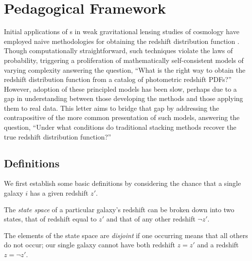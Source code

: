 \section{Pedagogical Framework}


Initial applications of \pzpdf s in weak gravitational lensing studies of cosmology have employed naive methodologies for obtaining the redshift distribution function \Nz.
Though computationally straightforward, such techniques violate the laws of probability, triggering a proliferation of mathematically self-consistent models of varying complexity answering the question, ``What is the right way to obtain the redshift distribution function from a catalog of photometric redshift PDFs?''
However, adoption of these principled models has been slow, perhaps due to a gap in understanding between those developing the methods and those applying them to real data.
This letter aims to bridge that gap by addressing the contrapositive of the more common presentation of such models, answering the question, ``Under what conditions do traditional stacking methods recover the true redshift distribution function?''

\subsection{Definitions}

We first establish some basic definitions by considering the chance that a single galaxy $i$ has a given redshift $z'$.

\begin{definition}\label{def:binarystatespace}
	The \textit{state space} of a particular galaxy's redshift can be broken down into two states, that of redshift equal to $z'$ and that of any other redshift $\lnot z'$.
\end{definition}

\begin{definition}\label{def:disjoint}
	The elements of the state space are \textit{disjoint} if one occurring means that all others do not occur; our single galaxy cannot have both redshift $z = z'$ and a redshift $z = \lnot z'$.
\end{definition}

